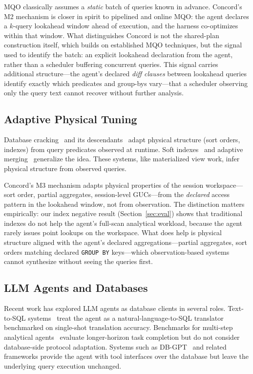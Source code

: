 MQO classically assumes a \emph{static} batch of queries known in advance. Concord's M2 mechanism is closer in spirit to pipelined and online MQO: the agent declares a $k$-query lookahead window ahead of execution, and the harness co-optimizes within that window. What distinguishes Concord is not the shared-plan construction itself, which builds on established MQO techniques, but the signal used to identify the batch: an explicit lookahead declaration from the agent, rather than a scheduler buffering concurrent queries. This signal carries additional structure---the agent's declared \emph{diff clauses} between lookahead queries identify exactly which predicates and group-bys vary---that a scheduler observing only the query text cannot recover without further analysis.

\subsection{Adaptive Physical Tuning}

Database cracking~\cite{idreos2007cracking} and its descendants~\cite{idreos2011crackingupdates,petraki2015holistic} adapt physical structure (sort orders, indexes) from query predicates observed at runtime. Soft indexes~\cite{graefe2010softindex} and adaptive merging~\cite{graefe2010adaptivemerge} generalize the idea. These systems, like materialized view work, infer physical structure from observed queries.

Concord's M3 mechanism adapts physical properties of the session workspace---sort order, partial aggregates, session-level GUCs---from the \emph{declared} access pattern in the lookahead window, not from observation. The distinction matters empirically: our index negative result (Section~\ref{sec:eval}) shows that traditional indexes do not help the agent's full-scan analytical workload, because the agent rarely issues point lookups on the workspace. What does help is physical structure aligned with the agent's declared aggregations---partial aggregates, sort orders matching declared \texttt{GROUP BY} keys---which observation-based systems cannot synthesize without seeing the queries first.

\subsection{LLM Agents and Databases}

Recent work has explored LLM agents as database clients in several roles. Text-to-SQL systems~\cite{spider2018,bird2023,spider2_2024} treat the agent as a natural-language-to-SQL translator benchmarked on single-shot translation accuracy. Benchmarks for multi-step analytical agents~\cite{insightbench2024,dabbench2024} evaluate longer-horizon task completion but do not consider database-side protocol adaptation. Systems such as DB-GPT~\cite{dbgpt2023} and related frameworks provide the agent with tool interfaces over the database but leave the underlying query execution unchanged.

